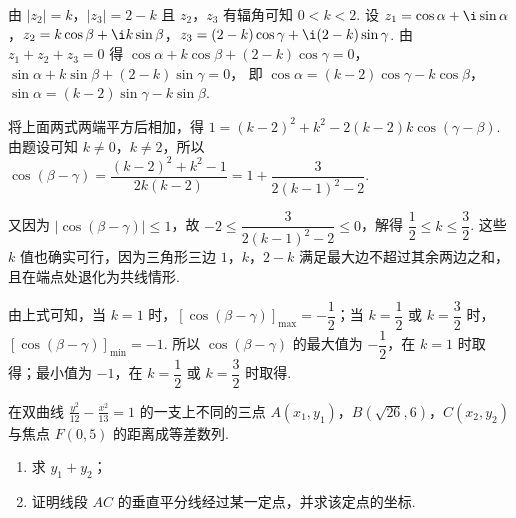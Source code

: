 \documentclass[UTF8,a4paper,oneside,11pt]{ctexbook}
\begin{document}
\begin{solution}
由 \(|z_2|=k\)，\(|z_3|=2-k\) 且 \(z_2\)，\(z_3\) 有辐角可知 \(0<k<2\). 设 \(z_1=\cos\alpha+\i\sin\alpha\)，\(z_2=k\cos\beta+\i k\sin\beta\)，\(z_3=(2-k)\cos\gamma+\i(2-k)\sin\gamma\). 由 \(z_1+z_2+z_3=0\) 得
\(\cos\alpha+k\cos\beta+(2-k)\cos\gamma=0\)，\(\sin\alpha+k\sin\beta+(2-k)\sin\gamma=0\)，
即 \(\cos\alpha=(k-2)\cos\gamma-k\cos\beta\)，\(\sin\alpha=(k-2)\sin\gamma-k\sin\beta\).

将上面两式两端平方后相加，得 \(1=(k-2)^2+k^2-2(k-2)k\cos(\gamma-\beta)\). 由题设可知 \(k\ne0\)，\(k\ne2\)，所以 \(\cos(\beta-\gamma)=\dfrac{(k-2)^2+k^2-1}{2k(k-2)}=1+\dfrac{3}{2(k-1)^2-2}\).

又因为 \(\left| \cos(\beta-\gamma) \right|\leqslant1\)，故 \(-2\leqslant\dfrac{3}{2(k-1)^2-2}\leqslant0\)，解得 \(\dfrac{1}{2}\leqslant k\leqslant\dfrac{3}{2}\). 这些 \(k\) 值也确实可行，因为三角形三边 \(1\)，\(k\)，\(2-k\) 满足最大边不超过其余两边之和，且在端点处退化为共线情形.

由上式可知，当 \(k=1\) 时，\(\left[ \cos(\beta-\gamma) \right]_{\max}=-\dfrac{1}{2}\)；当 \(k=\dfrac{1}{2}\) 或 \(k=\dfrac{3}{2}\) 时，\(\left[ \cos(\beta-\gamma) \right]_{\min}=-1\). 所以 \(\cos(\beta-\gamma)\) 的最大值为 \(-\dfrac{1}{2}\)，在 \(k=1\) 时取得；最小值为 \(-1\)，在 \(k=\dfrac{1}{2}\) 或 \(k=\dfrac{3}{2}\) 时取得.
\end{solution}

\begin{problem}
在双曲线 \(\frac{y^2}{12}-\frac{x^2}{13}=1\) 的一支上不同的三点 \(A(x_1,y_1)\)，\(B(\sqrt{26},6)\)，\(C(x_2,y_2)\) 与焦点 \(F(0,5)\) 的距离成等差数列.

\begin{enumerate}
\item 求 \(y_1+y_2\)；
\item 证明线段 \(AC\) 的垂直平分线经过某一定点，并求该定点的坐标.
\end{enumerate}
\end{problem}
\end{document}
